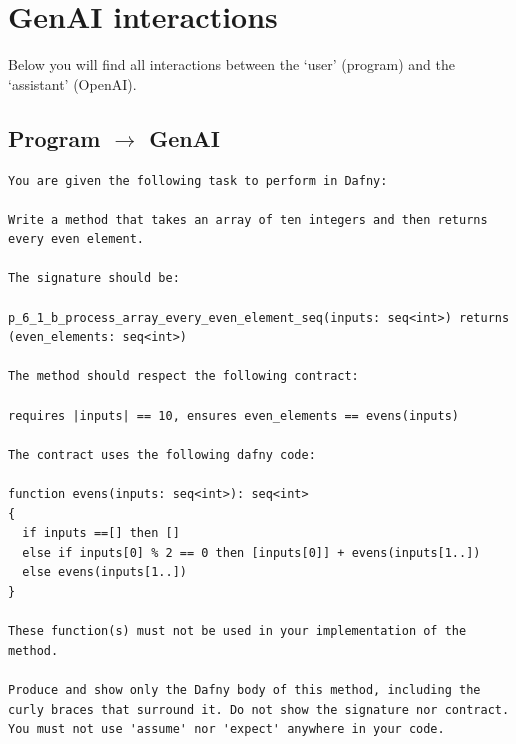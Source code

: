 \documentclass{article}
\begin{document}
\section*{GenAI interactions}
Below you will find all interactions between the `user' (program) and the `assistant' (OpenAI).
\subsection*{Program $\rightarrow$ GenAI}
\begin{lstlisting}
You are given the following task to perform in Dafny:

Write a method that takes an array of ten integers and then returns every even element.

The signature should be:

p_6_1_b_process_array_every_even_element_seq(inputs: seq<int>) returns (even_elements: seq<int>)

The method should respect the following contract:

requires |inputs| == 10, ensures even_elements == evens(inputs)

The contract uses the following dafny code:

function evens(inputs: seq<int>): seq<int>
{
  if inputs ==[] then []
  else if inputs[0] % 2 == 0 then [inputs[0]] + evens(inputs[1..])
  else evens(inputs[1..])
}

These function(s) must not be used in your implementation of the method.

Produce and show only the Dafny body of this method, including the curly braces that surround it. Do not show the signature nor contract. You must not use 'assume' nor 'expect' anywhere in your code.
\end{lstlisting}
\end{document}
